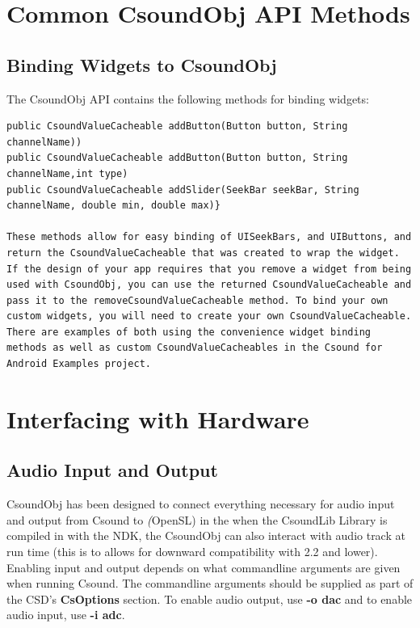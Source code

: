 \documentclass[11pt]{article}
\begin{document}

\section{Common CsoundObj API Methods}

\subsection{Binding Widgets to CsoundObj}

The CsoundObj API contains the following methods for binding widgets:

\begin{lstlisting}[caption=Methods for Widget Binding]
public CsoundValueCacheable addButton(Button button, String channelName))
public CsoundValueCacheable addButton(Button button, String channelName,int type)
public CsoundValueCacheable addSlider(SeekBar seekBar, String channelName, double min, double max)}

These methods allow for easy binding of UISeekBars, and UIButtons, and return the CsoundValueCacheable that was created to wrap the widget. If the design of your app requires that you remove a widget from being used with CsoundObj, you can use the returned CsoundValueCacheable and pass it to the removeCsoundValueCacheable method. To bind your own custom widgets, you will need to create your own CsoundValueCacheable.  There are examples of both using the convenience widget binding methods as well as custom CsoundValueCacheables in the Csound for Android Examples project.
\end{lstlisting}

\section{Interfacing with Hardware}
\subsection{Audio Input and Output}

CsoundObj has been designed to connect everything necessary for audio input and output from Csound to \textit(OpenSL) in the when the CsoundLib Library is compiled in with the NDK, the CsoundObj can also interact with audio track at run time (this is to allows for  downward compatibility with 2.2 and lower).  Enabling input and output depends on what commandline arguments are given when running Csound.  The commandline arguments should be supplied as part of the CSD's \textbf{CsOptions} section.  To enable audio output, use \textbf{-o dac} and to enable audio input, use \textbf{-i adc}. 
\end{document}
